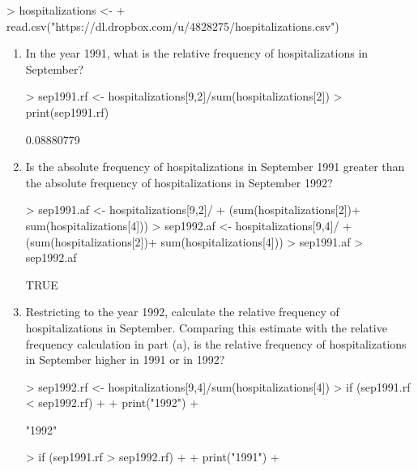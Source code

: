 \documentclass{article}
\begin{document}
\begin{Schunk}
\begin{Sinput}
> hospitalizations <- 
+   read.csv("https://dl.dropbox.com/u/4828275/hospitalizations.csv")
\end{Sinput}
\end{Schunk}

\begin{enumerate}
  \item In the year 1991, what is the relative frequency of hospitalizations in September?
\begin{Schunk}
\begin{Sinput}
> sep1991.rf <- hospitalizations[9,2]/sum(hospitalizations[2])
> print(sep1991.rf)
\end{Sinput}
\begin{Soutput}
[1] 0.08880779
\end{Soutput}
\end{Schunk}

  \item Is the absolute frequency of hospitalizations in September 1991 greater than the absolute frequency of hospitalizations in September 1992?

\begin{Schunk}
\begin{Sinput}
> sep1991.af <- hospitalizations[9,2]/
+   (sum(hospitalizations[2])+ sum(hospitalizations[4]))
> sep1992.af <- hospitalizations[9,4]/
+   (sum(hospitalizations[2])+ sum(hospitalizations[4]))
> sep1991.af > sep1992.af
\end{Sinput}
\begin{Soutput}
[1] TRUE
\end{Soutput}
\end{Schunk}
\pagebreak
  \item Restricting to the year 1992, calculate the relative frequency of hospitalizations in September.  Comparing this estimate with the relative frequency calculation in part (a), is the relative frequency of hospitalizations in September higher in 1991 or in 1992?
  
  
\begin{Schunk}
\begin{Sinput}
> sep1992.rf <- hospitalizations[9,4]/sum(hospitalizations[4])
> if (sep1991.rf < sep1992.rf)
+ {
+   print("1992")
+ }
\end{Sinput}
\begin{Soutput}
[1] "1992"
\end{Soutput}
\begin{Sinput}
> if (sep1991.rf > sep1992.rf)
+ {
+   print("1991")
+ }
\end{Sinput}
\end{Schunk}


\end{enumerate}
\pagebreak
\end{document}
